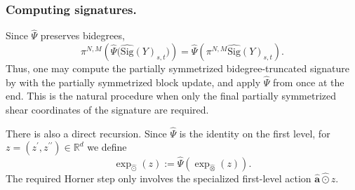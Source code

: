 \documentclass{amsart}
\theoremstyle{definition}
\theoremstyle{remark}
\newcommand{\Sigsym}[1]{\widehat{\mathrm{Sig}}(#1)}
\begin{document}
\subsubsection{Computing signatures.}

Since $\widehat{\Psi}$ preserves bidegrees,
\[
    \pi^{N,M}
    \left(
        \widehat{\Psi}
        \bigl(
            \Sigsym{Y}_{s,t}
        \bigr)
    \right)
    =
    \widehat{\Psi}
    \left(
        \pi^{N,M}\Sigsym{Y}_{s,t}
    \right).
\]
Thus, one may compute the partially symmetrized bidegree-truncated signature
by  with the partially symmetrized block
update, and apply $\widehat{\Psi}$ from
 once at the end. This is the natural
procedure when only the final partially symmetrized shear coordinates of the
signature are required.

There is also a direct recursion. Since $\widehat{\Psi}$ is the identity
on the first level, for
$z=(z^{\prime},z^{\prime\prime})\in\mathbb{R}^{d}$ we define
\[
    \exp_{\widehat{\odot}}(z)
    :=
    \widehat{\Psi}
    \left(
        \exp_{\widehat{\otimes}}(z)
    \right).
\]
The required Horner step only involves the specialized first-level action
$\widehat{\mathbf{a}}\widehat{\odot}z$.
\end{document}
